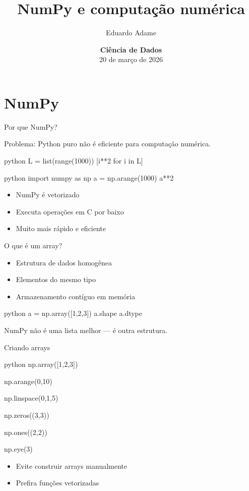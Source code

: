 \documentclass[xcolor=dvipsnames,t,aspectratio=169]{beamer}
\title{NumPy e computação numérica }
\author{Eduardo Adame}
\date{{\color{nes_dark_purple}\textbf{Ciência de Dados}\\[0.5em] 20 de março de 2026 }}
\newcommand{\highlight}[1]{{\color{nes_dark_orange} #1}}
\begin{document}
\frame[plain]{\titlepage}
\setcounter{framenumber}{0}


\section{NumPy}

\begin{frame}[c, fragile]{Por que NumPy?}

Problema: Python puro não é eficiente para computação numérica.

\begin{code}{python}
L = list(range(1000))
[i**2 for i in L]
\end{code}

\begin{code}[NumPy]{python}
import numpy as np
a = np.arange(1000)
a**2
\end{code}

\begin{itemize}
\item NumPy é \highlight{vetorizado}
\item Executa operações em \highlight{C por baixo}
\item Muito mais rápido e eficiente
\end{itemize}

\end{frame}


\begin{frame}[c, fragile]{O que é um array?}
\begin{itemize}
\item Estrutura de dados homogênea
\item Elementos do mesmo tipo
\item Armazenamento contíguo em memória
\end{itemize}

\begin{code}[Exemplo]{python}
a = np.array([1,2,3])
a.shape
a.dtype
\end{code}

\begin{display}[Importante]
NumPy não é uma lista melhor — é outra estrutura.
\end{display}

\end{frame}

\begin{frame}[c, fragile]{Criando arrays}

\begin{code}[Criação]{python}
np.array([1,2,3])

np.arange(0,10)

np.linspace(0,1,5)

np.zeros((3,3))

np.ones((2,2))

np.eye(3)
\end{code}

\begin{itemize}
\item Evite construir arrays manualmente
\item Prefira funções vetorizadas
\end{itemize}

\end{frame}
\end{document}
